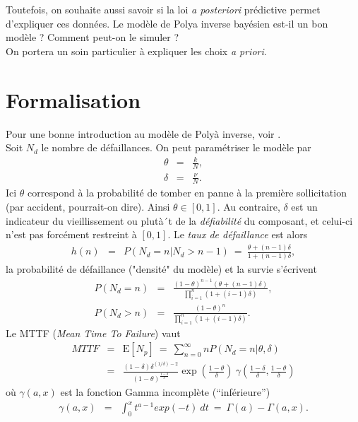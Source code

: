 \documentclass[10pt]{article}
\newcommand{\E}{\mbox{E}}
\newcommand{\1}{\mathbbm{1}}
\begin{document}
Toutefois, on souhaite aussi savoir si la loi {\it a posteriori} pr\'edictive permet d'expliquer ces donn\'ees. Le mod\`ele de Polya inverse bay\'esien est-il un bon mod\`ele ? Comment peut-on le simuler ? \\

On portera un soin particulier \`a expliquer les choix {\it a priori}. 

\section{Formalisation}

Pour une bonne introduction au mod\`ele de Poly\`a inverse, voir \cite{pasanisi2015}. \\

Soit $N_d$ le nombre de d\'efaillances. On peut param\'etriser le mod\`ele par
\begin{eqnarray*}
\theta & = & \frac{k}{N}, \\
\delta & = & \frac{\nu}{N}.
\end{eqnarray*}
Ici $\theta$ correspond \`a  la probabilit\'e de tomber en panne \`a  la
premi\`ere sollicitation (par accident, pourrait-on dire). Ainsi $\theta\in[0,1]$.
Au contraire, $\delta$ est un indicateur du vieillissement ou plut\`a´t de la {\it d\'efiabilit\'e} du
composant, et celui-ci n'est pas forc\'ement restreint \`a  $[0,1]$. %
Le {\it taux de d\'efaillance} est alors
\begin{eqnarray*}
h(n) & = & P(N_d=n|N_d>n-1) \ = \ \frac{\theta + (n-1)\delta}{1+(n-1)\delta},
\end{eqnarray*}
la probabilit\'e de d\'efaillance ("densit\'e" du mod\`ele) et la survie
s'\'ecrivent
\begin{eqnarray*}
P(N_d=n) & = & \frac{(1-\theta)^{n-1} \left(\theta + (n-1)\delta\right)}{\prod\limits_{i=1}^n (1+(i-1)\delta)}, \\
P(N_d>n) & = & \frac{(1-\theta)^{n}}{\prod\limits_{i=1}^n (1+(i-1)\delta)}.
\end{eqnarray*}
Le MTTF (\textit{Mean Time To Failure}) vaut
 \begin{eqnarray*}
MTTF & = & \E[N_p] \ = \  \sum\limits_{n=0}^{\infty} nP(N_d=n|\theta,\delta) \\
&  = & 
         \frac{(1-\delta)\delta^{(1/\delta)-2}}{(1-\theta)^{\frac{1-\delta}{\delta}}} \exp\left(\frac{1-\theta}{\delta}\right) \ \gamma\left(\frac{1-\delta}{\delta},\frac{1-\theta}{\delta}\right)
\end{eqnarray*}
o\`u $\gamma(a,x)$ est la  fonction Gamma incompl\`ete (``inf\'erieure'')
\begin{eqnarray*}
\gamma(a,x) & = & \int_{0}^{x} t^{a-1} exp(-t) \ dt \ = \ \Gamma(a)-\Gamma(a,x).
\end{eqnarray*}
\end{document}
